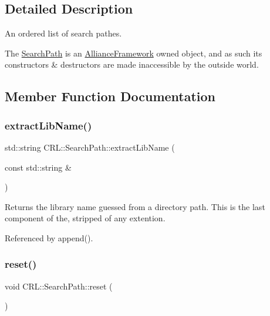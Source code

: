 \subsection{Detailed Description}
An ordered list of search pathes. 

The \hyperlink{classCRL_1_1SearchPath}{Search\+Path} is an \hyperlink{classCRL_1_1AllianceFramework}{Alliance\+Framework} owned object, and as such it\textquotesingle{}s constructors \& destructors are made inaccessible by the outside world. 

\subsection{Member Function Documentation}
\mbox{\label{classCRL_1_1SearchPath_aef473ae1037c8cb792a3af02baea6fdc}} 
\subsubsection{\texorpdfstring{extract\+Lib\+Name()}{extractLibName()}}
{\footnotesize\ttfamily std\+::string C\+R\+L\+::\+Search\+Path\+::extract\+Lib\+Name (\begin{DoxyParamCaption}\item[{const std\+::string \&}]{ }\end{DoxyParamCaption})\hspace{0.3cm}{\ttfamily [static]}}

\begin{DoxyReturn}{Returns}
the library name guessed from a directory path. This is the last component of the, stripped of any extention. 
\end{DoxyReturn}


Referenced by append().

\mbox{\label{classCRL_1_1SearchPath_a7081332b63c642917b4ca15f665662f4}} 
\subsubsection{\texorpdfstring{reset()}{reset()}}
{\footnotesize\ttfamily void C\+R\+L\+::\+Search\+Path\+::reset (\begin{DoxyParamCaption}{ }\end{DoxyParamCaption})\hspace{0.3cm}{\ttfamily [inline]}}

